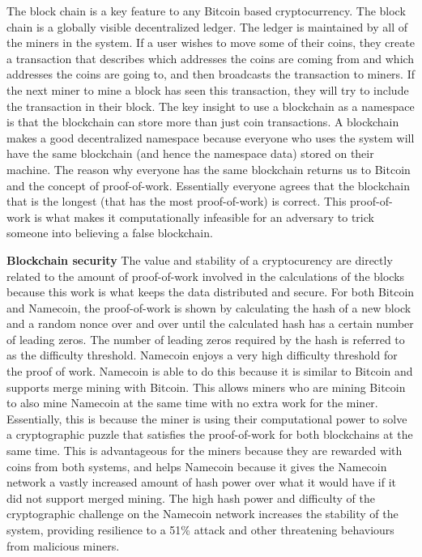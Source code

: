 The block chain is a key feature to any Bitcoin based cryptocurrency. The block chain is a globally visible decentralized ledger. The ledger is maintained by all of the miners in the system. If a user wishes to move some of their coins, they create a transaction that describes which addresses the coins are coming from and which addresses the coins are going to, and then broadcasts the transaction to miners. If the next miner to mine a block has seen this transaction, they will try to include the transaction in their block.
    The key insight to use a blockchain as a namespace is that the blockchain can store more than just coin transactions. A blockchain makes a good decentralized namespace because everyone who uses the system will have the same blockchain (and hence the namespace data) stored on their machine. The reason why everyone has the same blockchain returns us to Bitcoin and the concept of proof-of-work. Essentially everyone agrees that the blockchain that is the longest (that has the most proof-of-work) is correct. This proof-of-work is what makes it computationally infeasible for an adversary to trick someone into believing a false blockchain. 

{\bf Blockchain security}
The value and stability of a cryptocurency are directly related to the amount of proof-of-work involved in the calculations of the blocks because this work is what keeps the data distributed and secure. For both Bitcoin and Namecoin, the proof-of-work is shown by calculating the hash of a new block and a random nonce over and over until the calculated hash has a certain number of leading zeros. The number of leading zeros required by the hash is referred to as the difficulty threshold. Namecoin enjoys a very high difficulty threshold for the proof of work. Namecoin is able to do this because it is similar to Bitcoin and supports merge mining with Bitcoin. This allows miners who are mining Bitcoin to also mine Namecoin at the same time with no extra work for the miner. Essentially, this is because the miner is using their computational power to solve a cryptographic puzzle that satisfies the proof-of-work for both blockchains at the same time. This is advantageous for the miners because they are rewarded with coins from both systems, and helps Namecoin because it gives the Namecoin network a vastly increased amount of hash power over what it would have if it did not support merged mining. The high hash power and difficulty of the cryptographic challenge on the Namecoin network increases the stability of the system, providing resilience to a 51\% attack and other threatening behaviours from malicious miners.


